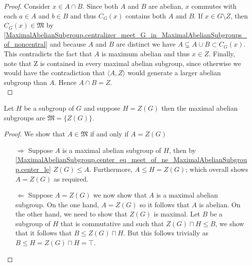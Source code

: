 \begin{proof}
  Consider $x \in A \cap B$. Since both $A$ and $B$ are abelian, $x$ commutes with each $a \in A$ and $b \in B$ and thus $C_G(x)$ contains both $A$ and $B$.  If $x \in G \setminus Z$, then $C_G(x) \in \mathfrak{M}$ by \ref{MaximalAbelianSubgroup.centralizer_meet_G_in_MaximalAbelianSubgroups_of_noncentral} and because $A$ and $B$ are distinct we have $A \subsetneq A \cup B \subset C_G(x)$. 
  This contradicts the fact that $A$ is maximum abelian and thus $x \in Z$. Finally, note that Z is contained in every maximal abelian subgroup, since otherwise we would have the contradiction that $\langle A, Z \rangle$ would generate a larger abelian subgroup than $A$. Hence $A \cap B = Z$. \\
\end{proof}


\begin{lemma}
\label{MaximalAbelianSubgroup.singleton_of_cen_eq_G}
\leanok
Let $H$ be a subgroup of $G$ and suppose $H = Z(G)$ then the maximal abelian subgroups are $\mathfrak{M} = \{Z(G)\}$.
\end{lemma}
\begin{proof}
  We show that $A \in \mathfrak{M}$ if and only if $A = Z(G)$
  \begin{itemize}
    \item[$\Rightarrow$] Suppose $A$ is a maximal abelian subgroup of $H$, then by \ref{MaximalAbelianSubgroup.center_eq_meet_of_ne_MaximalAbelianSubgroup.center_le} $Z(G) \le A$. Furthermore, $A \le H = Z(G)$; which overall shows $A = Z(G)$ as required.
    \item[$\Leftarrow$] Suppose $A = Z(G)$ we now show that $A$ is a maximal abelian subgroup. 
      On the one hand, $A = Z(G)$ so it follows that $A$ is abelian.
      On the other hand, we need to show that $Z(G)$ is maximal. Let $B$ be a subgroup of $H$ that is commutative and such that $Z(G) \sqcap H \le B$, we show that it follows that $B \le Z(G) \sqcap H$. But this follows trivially as 
      $B \leq H = Z(G) \sqcap H = \top$.
  \end{itemize}
\end{proof}

